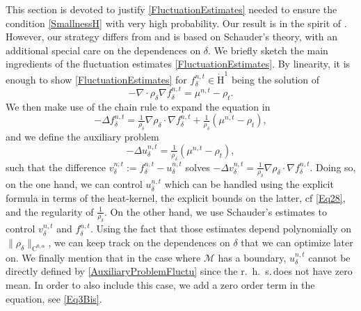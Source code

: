 \documentclass[11pt,a4paper,oneside]{amsart}
\numberwithin{equation}{section}
\newcommand{\cc}{\text{C}}
\newcommand{\rhs}{r.~h.~s.\,}
\begin{document}
%
This section is devoted to justify \eqref{FluctuationEstimates} needed to ensure the condition \eqref{SmallnessH} with very high probability. Our result is in the spirit of \cite[Theorem 3.3]{ambrosio2019finer}. However, our strategy differs from \cite[Theorem 3.3]{ambrosio2019finer} and is based on Schauder's theory, with an additional special care on the dependences on $\delta$.
We briefly sketch the main ingredients of the fluctuation estimates \eqref{FluctuationEstimates}. By linearity, it is enough to show \eqref{FluctuationEstimates} for $f^{n,t}_\delta\in \dot{\mathrm{H}}^1$ being the solution of 
%
\begin{equation}\label{Eq2}
%
-\nabla\cdot\rho_\delta\nabla f^{n,t}_\delta=\mu^{n,t}-\rho_t.
%
\end{equation}
%
We then make use of the chain rule to expand the equation in
%
\begin{equation}\label{Eq3}
%
-\Delta f^{n,t}_\delta=\tfrac{1}{\rho_\delta}\nabla\rho_\delta\cdot\nabla f^{n,t}_\delta+\tfrac{1}{\rho_\delta}(\mu^{n,t}-\rho_t),
%
\end{equation}
%
and we define the auxiliary problem
%
\begin{equation}\label{AuxiliaryProblemFluctu}
%
-\Delta u^{n,t}_\delta=\tfrac{1}{\rho_\delta}(\mu^{n,t}-\rho_t),
%
\end{equation}
%
such that the difference $v^{n,t}_\delta:=f^{n,t}_\delta-u^{n,t}_\delta$ solves $-\Delta v^{n,t}_\delta=\tfrac{1}{\rho_\delta}\nabla\rho_\delta\cdot\nabla f^{n,t}_\delta$. Doing so, on the one hand, we can control $u^{n,t}_\delta$ which can be handled using the explicit formula in terms of the heat-kernel, the explicit bounds on the latter, cf \eqref{Eq28}, and the regularity of $\frac{1}{\rho_\delta}$. On the other hand, we use Schauder's estimates to control $v^{n,t}_\delta$ and $f^{n,t}_\delta$. Using the fact that those estimates depend polynomially on $\|\rho_\delta\|_{\cc^{0,\alpha}}$, we can keep track on the dependences on $\delta$ that we can optimize later on. We finally mention that in the case where $\mathcal{M}$ has a boundary, $u^{n,t}_\delta$ cannot be directly defined by \eqref{AuxiliaryProblemFluctu} since the \rhs does not have zero mean. In order to also include this case, we add a zero order term in the equation, see \eqref{Eq3Bis}.
\end{document}
